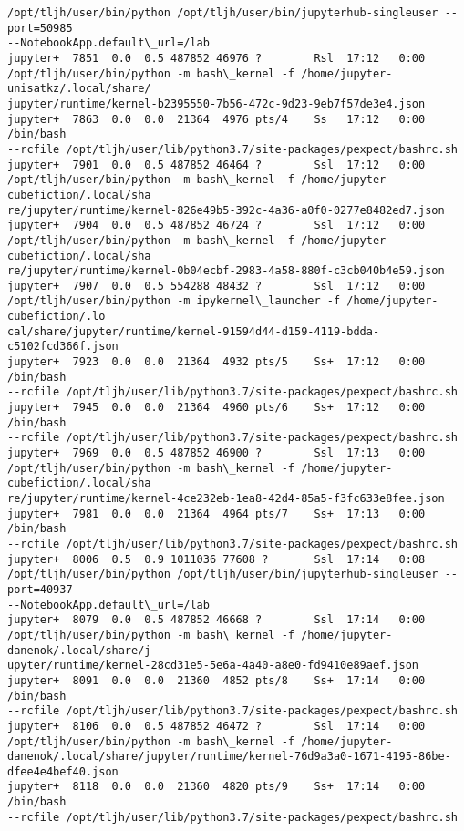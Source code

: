 \documentclass[11pt]{article}
\begin{document}
\begin{Verbatim}[commandchars=\\\{\}]
/opt/tljh/user/bin/python /opt/tljh/user/bin/jupyterhub-singleuser --port=50985
--NotebookApp.default\_url=/lab
jupyter+  7851  0.0  0.5 487852 46976 ?        Rsl  17:12   0:00
/opt/tljh/user/bin/python -m bash\_kernel -f /home/jupyter-unisatkz/.local/share/
jupyter/runtime/kernel-b2395550-7b56-472c-9d23-9eb7f57de3e4.json
jupyter+  7863  0.0  0.0  21364  4976 pts/4    Ss   17:12   0:00 /bin/bash
--rcfile /opt/tljh/user/lib/python3.7/site-packages/pexpect/bashrc.sh
jupyter+  7901  0.0  0.5 487852 46464 ?        Ssl  17:12   0:00
/opt/tljh/user/bin/python -m bash\_kernel -f /home/jupyter-cubefiction/.local/sha
re/jupyter/runtime/kernel-826e49b5-392c-4a36-a0f0-0277e8482ed7.json
jupyter+  7904  0.0  0.5 487852 46724 ?        Ssl  17:12   0:00
/opt/tljh/user/bin/python -m bash\_kernel -f /home/jupyter-cubefiction/.local/sha
re/jupyter/runtime/kernel-0b04ecbf-2983-4a58-880f-c3cb040b4e59.json
jupyter+  7907  0.0  0.5 554288 48432 ?        Ssl  17:12   0:00
/opt/tljh/user/bin/python -m ipykernel\_launcher -f /home/jupyter-cubefiction/.lo
cal/share/jupyter/runtime/kernel-91594d44-d159-4119-bdda-c5102fcd366f.json
jupyter+  7923  0.0  0.0  21364  4932 pts/5    Ss+  17:12   0:00 /bin/bash
--rcfile /opt/tljh/user/lib/python3.7/site-packages/pexpect/bashrc.sh
jupyter+  7945  0.0  0.0  21364  4960 pts/6    Ss+  17:12   0:00 /bin/bash
--rcfile /opt/tljh/user/lib/python3.7/site-packages/pexpect/bashrc.sh
jupyter+  7969  0.0  0.5 487852 46900 ?        Ssl  17:13   0:00
/opt/tljh/user/bin/python -m bash\_kernel -f /home/jupyter-cubefiction/.local/sha
re/jupyter/runtime/kernel-4ce232eb-1ea8-42d4-85a5-f3fc633e8fee.json
jupyter+  7981  0.0  0.0  21364  4964 pts/7    Ss+  17:13   0:00 /bin/bash
--rcfile /opt/tljh/user/lib/python3.7/site-packages/pexpect/bashrc.sh
jupyter+  8006  0.5  0.9 1011036 77608 ?       Ssl  17:14   0:08
/opt/tljh/user/bin/python /opt/tljh/user/bin/jupyterhub-singleuser --port=40937
--NotebookApp.default\_url=/lab
jupyter+  8079  0.0  0.5 487852 46668 ?        Ssl  17:14   0:00
/opt/tljh/user/bin/python -m bash\_kernel -f /home/jupyter-danenok/.local/share/j
upyter/runtime/kernel-28cd31e5-5e6a-4a40-a8e0-fd9410e89aef.json
jupyter+  8091  0.0  0.0  21360  4852 pts/8    Ss+  17:14   0:00 /bin/bash
--rcfile /opt/tljh/user/lib/python3.7/site-packages/pexpect/bashrc.sh
jupyter+  8106  0.0  0.5 487852 46472 ?        Ssl  17:14   0:00
/opt/tljh/user/bin/python -m bash\_kernel -f /home/jupyter-
danenok/.local/share/jupyter/runtime/kernel-76d9a3a0-1671-4195-86be-
dfee4e4bef40.json
jupyter+  8118  0.0  0.0  21360  4820 pts/9    Ss+  17:14   0:00 /bin/bash
--rcfile /opt/tljh/user/lib/python3.7/site-packages/pexpect/bashrc.sh

\end{Verbatim}
\end{document}
